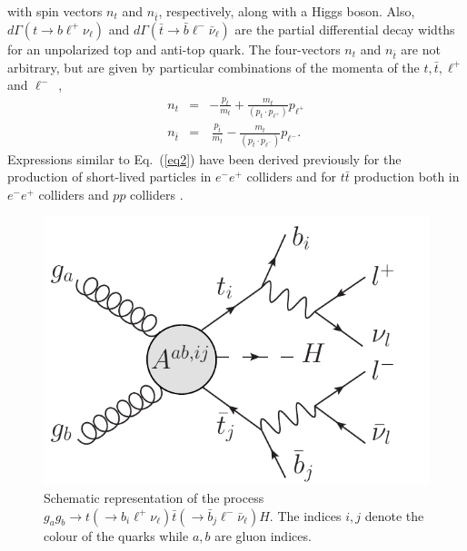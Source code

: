 \documentclass[aps,preprint,tightenlines,floatfix,superscriptaddress,nofootinbib,showpacs]{revtex4-1}
\def\bea{\begin{eqnarray}}
\def\eea{\end{eqnarray}}
\def\tbar{\bar{t}}
\def\bbar{\bar{b}}
\def\nubar{{\bar{\nu}}_{\ell}}
\providecommand{\DIFdelbegin}{} %
\providecommand{\DIFaddbeginFL}{} %
\providecommand{\DIFaddendFL}{} %
\providecommand{\DIFdelendFL}{} %
\begin{document}
with spin vectors $n_t$ and $n_{\bar{t}}$, respectively, along with a Higgs
boson.  Also, $d\Gamma(t\to b{\ell}^+\nu_{\ell})$ and
$d\Gamma(\tbar \to \bbar {\ell}^-\nubar)$ are the
partial differential decay widths for an unpolarized top and
anti-top quark.  The four-vectors
$n_t$ and $n_{\tbar}$ are not arbitrary, but are
given by particular combinations of the
momenta of the $t,\tbar, \ell^+$ and $\ell^-$~\cite{Arens},
%
\bea
\label{eq3}
n_t&=&-\frac{p_t}{m_t}+\frac{m_t}{(p_t\cdot p_{{\ell}^+})}p_{{\ell}^+}\\
\label{eq4}
n_{\tbar}&=&\,\frac{p_{\tbar}}{m_t}-\frac{m_t}{(p_{\tbar}\cdot p_{{\ell}^-})}p_{{\ell}^-}.
\eea
%
Expressions similar to Eq.~(\ref{eq2}) have been derived previously for the
production of short-lived particles in $e^-e^+$ colliders
\cite{kawasaki} and for $t\tbar$ production both in
$e^-e^+$ colliders \cite{Arens} and $pp$ colliders
\cite{ale1,*ale2,*ale3,*ale4}. \par

\begin{center}
\DIFdelbegin %
\DIFdelendFL \DIFaddbeginFL \begin{figure}[H]
\DIFaddendFL \centering
\includegraphics[scale=0.6]{esquematico_II.pdf}
\vspace*{0.02\textwidth}
\caption{Schematic representation of the process $g_ag_b\to t(\to
  b_i{\ell}^+\nu_{\ell})\tbar(\to \bbar_j {\ell}^- \nubar) H$. The
  indices $i,j$ denote the colour of the quarks while $a,b$ are gluon
  indices.}
\label{fig2}
\end{figure}
\end{center}
\end{document}
